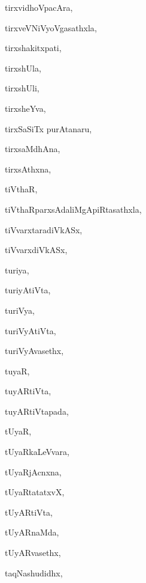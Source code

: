 \begin{multicols}{3}
{\noindent
{tirxvidhoVpacAra}, \pageref{tirxvidhoVpacAra}

\noindent
{tirxveVNiVyoVgasathxla}, \pageref{tirxveVNiVyoVgasathxla}

\noindent
{tirxshakitxpati}, \pageref{tirxshakitxpati}

\noindent
{tirxshUla}, \pageref{tirxshUla}

\noindent
{tirxshUli}, \pageref{tirxshUli}

\noindent
{tirxsheYva}, \pageref{tirxsheYva}

\noindent
{tirxSaSiTx purAtanaru}, \pageref{tirxSaSiTx purAtanaru}

\noindent
{tirxsaMdhAna}, \pageref{tirxsaMdhAna}

\noindent
{tirxsAthxna}, \pageref{tirxsAthxna}

\noindent
{tiVthaR}, \pageref{tiVthaR}

\noindent
{tiVthaRparxsAdaliMgApiRtasathxla}, \pageref{tiVthaRparxsAdaliMgApiRtasathxla}

\noindent
{tiVvarxtaradiVkASx}, \pageref{tiVvarxtaradiVkASx}

\noindent
{tiVvarxdiVkASx}, \pageref{tiVvarxdiVkASx}

\noindent
{turiya}, \pageref{turiya}

\noindent
{turiyAtiVta}, \pageref{turiyAtiVta}

\noindent
{turiVya}, \pageref{turiVya}

\noindent
{turiVyAtiVta}, \pageref{turiVyAtiVta}

\noindent
{turiVyAvasethx}, \pageref{turiVyAvasethx}

\noindent
{tuyaR}, \pageref{tuyaR}

\noindent
{tuyARtiVta}, \pageref{tuyARtiVta}

\noindent
{tuyARtiVtapada}, \pageref{tuyARtiVtapada}

\noindent
{tUyaR}, \pageref{tUyaR}

\noindent
{tUyaRkaLeVvara}, \pageref{tUyaRkaLeVvara}

\noindent
{tUyaRjAcnxna}, \pageref{tUyaRjAcnxna}

\noindent
{tUyaRtatatxvX}, \pageref{tUyaRtatatxvX}

\noindent
{tUyARtiVta}, \pageref{tUyARtiVta}

\noindent
{tUyARnaMda}, \pageref{tUyARnaMda}

\noindent
{tUyARvasethx}, \pageref{tUyARvasethx}

\noindent
{taqNashudidhx}, \pageref{taqNashudidhx}

}
\end{multicols}
